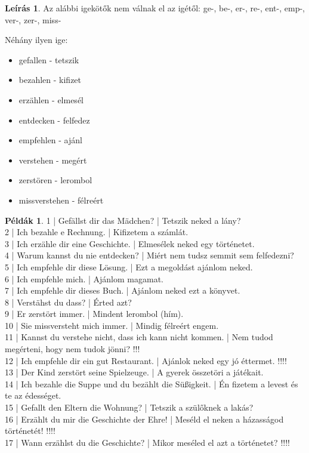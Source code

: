 \documentclass{article}
\theoremstyle{definition}
\newtheorem*{exmp}{Példák}
\newtheorem*{desc}{Leírás}
\begin{document}
\begin{desc}
Az alábbi igekötők nem válnak el az igétől:
ge-, be-, er-, re-, ent-, emp-, ver-, zer-, miss-

Néhány ilyen ige:
\begin{itemize}
\item gefallen - tetszik
\item bezahlen - kifizet
\item erzählen - elmesél
\item entdecken - felfedez
\item empfehlen - ajánl
\item verstehen - megért
\item zerstören - lerombol
\item missverstehen - félreért
\end{itemize}
\end{desc}

\begin{exmp}
1 | Gefällst dir das Mädchen? | Tetszik neked a lány?\\
2 | Ich bezahle e Rechnung. | Kifizetem a számlát.\\
3 | Ich erzähle dir eine Geschichte. | Elmesélek neked egy történetet.\\
4 | Warum kannst du nie entdecken? | Miért nem tudsz semmit sem felfedezni?\\
5 | Ich empfehle dir diese Lösung. | Ezt a megoldást ajánlom neked.\\
6 | Ich empfehle mich. | Ajánlom magamat.\\
7 | Ich empfehle dir dieses Buch. | Ajánlom neked ezt a könyvet.\\
8 | Verstähst du dass? | Érted azt?\\
9 | Er zerstört immer. | Mindent lerombol (hím).\\
10 | Sie missversteht mich immer. | Mindig félreért engem.\\
11 | Kannst du verstehe nicht, dass ich kann nicht kommen. | Nem tudod megérteni, hogy nem tudok jönni? !!!\\
12 | Ich empfehle dir ein gut Restaurant. | Ajánlok neked egy jó éttermet. !!!!\\
13 | Der Kind zerstört seine Spielzeuge. | A gyerek összetöri a játékait.\\
14 | Ich bezahle die Suppe und du bezählt die Süßigkeit. | Én fizetem a levest és te az édességet.\\
15 | Gefallt den Eltern die Wohnung? | Tetszik a szülőknek a lakás?\\
16 | Erzählt du mir die Geschichte der Ehre! | Meséld el neken a házasságod történetét! !!!!\\
17 | Wann erzählst du die Geschichte? | Mikor meséled el azt a történetet? !!!!\\
\end{exmp}
\end{document}
